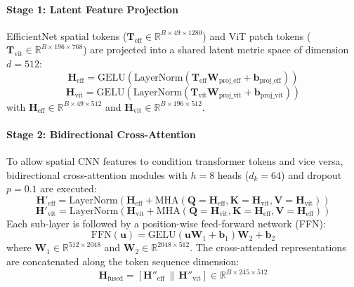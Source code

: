 \documentclass[journal]{IEEEtran}
\begin{document}
\paragraph{Stage 1: Latent Feature Projection}
EfficientNet spatial tokens ($\mathbf{T}_{\text{eff}} \in \mathbb{R}^{B \times 49 \times 1280}$) and ViT patch tokens ($\mathbf{T}_{\text{vit}} \in \mathbb{R}^{B \times 196 \times 768}$) are projected into a shared latent metric space of dimension $d = 512$:
\begin{equation}
\mathbf{H}_{\text{eff}} = \text{GELU}(\text{LayerNorm}(\mathbf{T}_{\text{eff}}\mathbf{W}_{\text{proj\_eff}} + \mathbf{b}_{\text{proj\_eff}}))
\end{equation}
\begin{equation}
\mathbf{H}_{\text{vit}} = \text{GELU}(\text{LayerNorm}(\mathbf{T}_{\text{vit}}\mathbf{W}_{\text{proj\_vit}} + \mathbf{b}_{\text{proj\_vit}}))
\end{equation}
with $\mathbf{H}_{\text{eff}} \in \mathbb{R}^{B \times 49 \times 512}$ and $\mathbf{H}_{\text{vit}} \in \mathbb{R}^{B \times 196 \times 512}$.

\paragraph{Stage 2: Bidirectional Cross-Attention}
To allow spatial CNN features to condition transformer tokens and vice versa, bidirectional cross-attention modules with $h=8$ heads ($d_k = 64$) and dropout $p=0.1$ are executed:
\begin{equation}
\mathbf{H}'_{\text{eff}} = \text{LayerNorm}\left(\mathbf{H}_{\text{eff}} + \text{MHA}(\mathbf{Q}=\mathbf{H}_{\text{eff}}, \mathbf{K}=\mathbf{H}_{\text{vit}}, \mathbf{V}=\mathbf{H}_{\text{vit}})\right)
\end{equation}
\begin{equation}
\mathbf{H}'_{\text{vit}} = \text{LayerNorm}\left(\mathbf{H}_{\text{vit}} + \text{MHA}(\mathbf{Q}=\mathbf{H}_{\text{vit}}, \mathbf{K}=\mathbf{H}_{\text{eff}}, \mathbf{V}=\mathbf{H}_{\text{eff}})\right)
\end{equation}
Each sub-layer is followed by a position-wise feed-forward network (FFN):
\begin{equation}
\text{FFN}(\mathbf{u}) = \text{GELU}(\mathbf{u}\mathbf{W}_1 + \mathbf{b}_1)\mathbf{W}_2 + \mathbf{b}_2
\end{equation}
where $\mathbf{W}_1 \in \mathbb{R}^{512 \times 2048}$ and $\mathbf{W}_2 \in \mathbb{R}^{2048 \times 512}$.
The cross-attended representations are concatenated along the token sequence dimension:
\begin{equation}
\mathbf{H}_{\text{fused}} = [\mathbf{H}''_{\text{eff}} \,\|\, \mathbf{H}''_{\text{vit}}] \in \mathbb{R}^{B \times 245 \times 512}
\end{equation}
\end{document}
